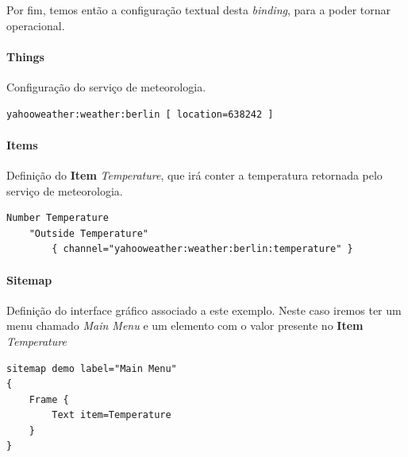 Por fim, temos então a configuração textual desta \textit{binding}, para a poder tornar operacional.

\paragraph*{Things}
\noindent
Configuração do serviço de meteorologia.

\begin{Verbatim}
yahooweather:weather:berlin [ location=638242 ]
\end{Verbatim}

\paragraph*{Items}
\noindent
Definição do \textbf{Item} \textit{Temperature}, que irá conter a temperatura retornada pelo serviço de meteorologia.

\begin{Verbatim}
Number Temperature
    "Outside Temperature"
        { channel="yahooweather:weather:berlin:temperature" }
\end{Verbatim}

\paragraph*{Sitemap}
\noindent
Definição do interface gráfico associado a este exemplo. Neste caso iremos ter um menu chamado \textit{Main Menu} e um elemento com o valor presente no \textbf{Item} \textit{Temperature}

\begin{Verbatim}
sitemap demo label="Main Menu"
{
	Frame {
		Text item=Temperature
	}
}
\end{Verbatim}


